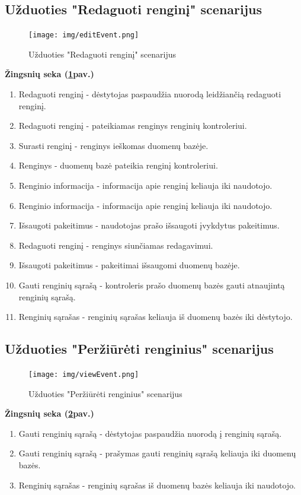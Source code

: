 \documentclass{VUMIFPSkursinis}
\begin{document}
\subsection{Užduoties "Redaguoti renginį" scenarijus}
\begin{figure}[H]
	\centering
	\texttt{[image: img/editEvent.png]}
	\caption{Užduoties "Redaguoti renginį" scenarijus}
	\label{fig:editEvent}
\end{figure}
\textbf{Žingsnių seka (\ref{fig:editEvent}pav.)}\\
\begin{enumerate}
	\item Redaguoti renginį - dėstytojas paspaudžia nuorodą leidžiančią redaguoti renginį.
	\item Redaguoti renginį - pateikiamas renginys renginių kontroleriui.
	\item Surasti renginį - renginys ieškomas duomenų bazėje.
	\item Renginys - duomenų bazė pateikia renginį kontroleriui.
	\item Renginio informacija -  informacija apie renginį keliauja iki naudotojo.
	\item Renginio informacija - informacija apie renginį keliauja iki naudotojo.
	\item Išsaugoti pakeitimus - naudotojas prašo išsaugoti įvykdytus pakeitimus.
	\item Redaguoti renginį - renginys siunčiamas redagavimui.
	\item Išsaugoti pakeitimus - pakeitimai išsaugomi duomenų bazėje.
	\item Gauti renginių sąrašą - kontroleris prašo duomenų bazės gauti atnaujintą renginių sąrašą.
	\item Renginių sąrašas - renginių sąrašas keliauja iš duomenų bazės iki dėstytojo.
\end{enumerate}
\subsection{Užduoties "Peržiūrėti renginius" scenarijus}
\begin{figure}[H]
	\centering
	\texttt{[image: img/viewEvent.png]}
	\caption{Užduoties "Peržiūrėti renginius" scenarijus}
	\label{fig:viewEvent}
\end{figure}
\textbf{Žingsnių seka (\ref{fig:viewEvent}pav.)}\\
\begin{enumerate}
	\item Gauti renginių sąrašą - dėstytojas paspaudžia nuorodą į renginių sąrašą.
	\item Gauti renginių sąrašą - prašymas gauti renginių sąrašą keliauja iki duomenų bazės.
	\item Renginių sąrašas - renginių sąrašas iš duomenų bazės keliauja iki naudotojo.
\end{enumerate}
\end{document}

